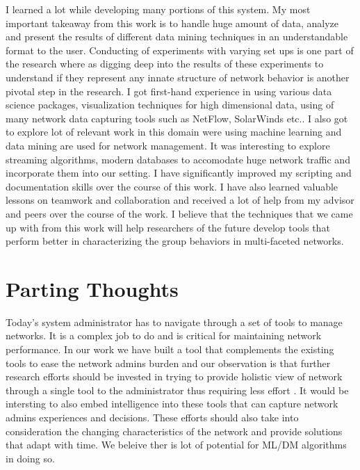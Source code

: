 I learned a lot while developing many portions of this system. My most important takeaway from this work is to handle huge amount of data, analyze and present the results of different data mining techniques in an understandable format to the user. Conducting of experiments with varying set ups is one part of the research where as digging deep into the results of these experiments to understand if they represent any innate structure of network behavior is another pivotal step in the research. 
I got first-hand experience in using various data science packages,  visualization techniques for high dimensional data, using of many network data capturing tools such as NetFlow, SolarWinds etc.. I also got to explore lot of relevant work in this domain were using machine learning and data mining are used for network management. It was interesting to explore streaming algorithms, modern databases to accomodate huge network traffic and incorporate them into our setting. I have significantly improved my scripting and documentation skills over the course of this work. I have also learned valuable lessons on teamwork and collaboration and received a lot of help from my advisor and peers over the course of the work. I believe that the techniques  that we came up with from this work will help researchers of the future develop tools that perform  better in characterizing the group behaviors in multi-faceted networks.

\section{Parting Thoughts}
Today's system administrator has to navigate through a set of tools to manage networks. It is a complex job to do and is critical for maintaining network performance. In our work we have built a tool that complements the existing tools to ease the network admins burden and our observation is that further research efforts should be invested in trying to provide holistic view of network through a single tool to the administrator thus requiring less effort . It would be intersting to also embed intelligence into these tools that can capture network admins experiences and decisions. These efforts should also take into consideration the changing characteristics of the network and provide solutions that adapt with time. We beleive ther is lot of potential for ML/DM algorithms in doing so.
